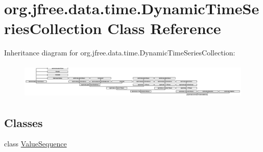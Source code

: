 \hypertarget{classorg_1_1jfree_1_1data_1_1time_1_1_dynamic_time_series_collection}{}\section{org.\+jfree.\+data.\+time.\+Dynamic\+Time\+Series\+Collection Class Reference}
\label{classorg_1_1jfree_1_1data_1_1time_1_1_dynamic_time_series_collection}
Inheritance diagram for org.\+jfree.\+data.\+time.\+Dynamic\+Time\+Series\+Collection\+:\begin{figure}[H]
\begin{center}
\leavevmode
\includegraphics[height=1.714286cm]{classorg_1_1jfree_1_1data_1_1time_1_1_dynamic_time_series_collection}
\end{center}
\end{figure}
\subsection*{Classes}
\begin{DoxyCompactItemize}
\item 
class \mbox{\hyperlink{classorg_1_1jfree_1_1data_1_1time_1_1_dynamic_time_series_collection_1_1_value_sequence}{Value\+Sequence}}
\end{DoxyCompactItemize}
